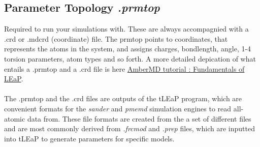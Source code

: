 \documentclass[a4paper]{article}
\begin{document}
\subsection{Parameter Topology \textit{.prmtop}}
Required to run your simulations with. These are always accompagnied with a .crd or .mdcrd (coordinate) file. The prmtop points to coordinates, that represents the atoms in the system, and assigns charges, bondlength, angle, 1-4 torsion parameters, atom types and so forth. A more detailed depication of what entails a .prmtop and a .crd file is here \href{https://ambermd.org/tutorials/pengfei/index.php}{AmberMD tutorial : Fundamentals of LEaP}.\\
\\
The .prmtop and the .crd files are outputs of the tLEaP program, which are convenient formats for the \textit{sander} and \textit{pmemd} simulation engines to read all-atomic data from. These file formats are created from the a set of different files and are most commonly derived from \textit{.frcmod} and \textit{.prep} files, which are inputted into tLEaP to generate parameters for specific models.
\end{document}

